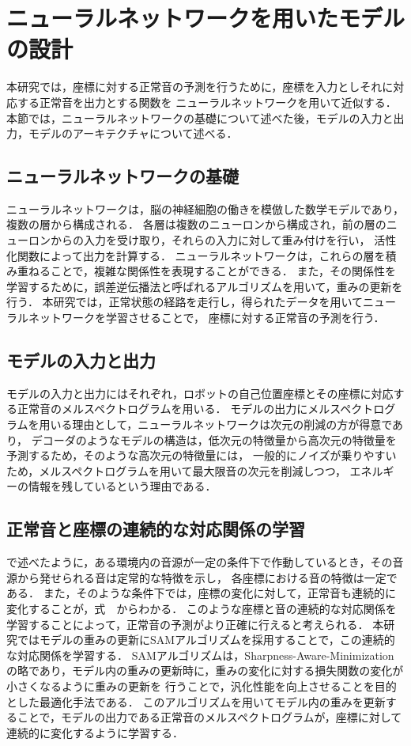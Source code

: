 \documentclass[../main]{subfiles}
\begin{document}
\section{ニューラルネットワークを用いたモデルの設計}
\label{sec:pmethod_neural_network}

本研究では，座標に対する正常音の予測を行うために，座標を入力としそれに対応する正常音を出力とする関数を
ニューラルネットワークを用いて近似する．
本節では，ニューラルネットワークの基礎について述べた後，モデルの入力と出力，モデルのアーキテクチャについて述べる．
\subsection{ニューラルネットワークの基礎}
ニューラルネットワークは，脳の神経細胞の働きを模倣した数学モデルであり，複数の層から構成される．
各層は複数のニューロンから構成され，前の層のニューロンからの入力を受け取り，それらの入力に対して重み付けを行い，
活性化関数によって出力を計算する．
ニューラルネットワークは，これらの層を積み重ねることで，複雑な関係性を表現することができる．
また，その関係性を学習するために，誤差逆伝播法と呼ばれるアルゴリズムを用いて，重みの更新を行う．
本研究では，正常状態の経路を走行し，得られたデータを用いてニューラルネットワークを学習させることで，
座標に対する正常音の予測を行う．
\subsection{モデルの入力と出力}
モデルの入力と出力にはそれぞれ，ロボットの自己位置座標とその座標に対応する正常音のメルスペクトログラムを用いる．
モデルの出力にメルスペクトログラムを用いる理由として，ニューラルネットワークは次元の削減の方が得意であり，
デコーダのようなモデルの構造は，低次元の特徴量から高次元の特徴量を予測するため，そのような高次元の特徴量には，
一般的にノイズが乗りやすいため，メルスペクトログラムを用いて最大限音の次元を削減しつつ，
エネルギーの情報を残しているという理由である．
\subsection{正常音と座標の連続的な対応関係の学習}
で述べたように，ある環境内の音源が一定の条件下で作動しているとき，その音源から発せられる音は定常的な特徴を示し，
各座標における音の特徴は一定である．
また，そのような条件下では，座標の変化に対して，正常音も連続的に変化することが，式　からわかる．
このような座標と音の連続的な対応関係を学習することによって，正常音の予測がより正確に行えると考えられる．
本研究ではモデルの重みの更新にSAMアルゴリズムを採用することで，この連続的な対応関係を学習する．
SAMアルゴリズムは，Sharpness-Aware-Minimizationの略であり，モデル内の重みの更新時に，重みの変化に対する損失関数の変化が小さくなるように重みの更新を
行うことで，汎化性能を向上させることを目的とした最適化手法である．
このアルゴリズムを用いてモデル内の重みを更新することで，モデルの出力である正常音のメルスペクトログラムが，座標に対して連続的に変化するように学習する．
\end{document}
